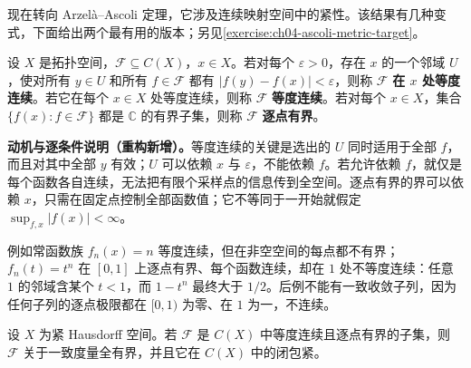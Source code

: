 \documentclass[../../main.tex]{subfiles}%
\begin{document}
现在转向 Arzel\`a--Ascoli 定理，它涉及连续映射空间中的紧性。该结果有几种变式，下面给出两个最有用的版本；另见\cref{exercise:ch04-ascoli-metric-target}。
\begin{definition}[等度连续与逐点有界]\label{definition:ch04-equicontinuous-pointwise-bounded}
设 $X$ 是拓扑空间，$\mathcal F\subseteq C(X)$，$x\in X$。若对每个 $\varepsilon>0$，存在 $x$ 的一个邻域 $U$，使对所有 $y\in U$ 和所有 $f\in\mathcal F$ 都有 $|f(y)-f(x)|<\varepsilon$，则称 $\mathcal F$ \textbf{在 $x$ 处等度连续}。若它在每个 $x\in X$ 处等度连续，则称 $\mathcal F$ \textbf{等度连续}。若对每个 $x\in X$，集合 $\{f(x):f\in\mathcal F\}$ 都是 $\mathbb C$ 的有界子集，则称 $\mathcal F$ \textbf{逐点有界}。
\end{definition}
\begin{remark}
\textbf{动机与逐条件说明（重构新增）。}等度连续的关键是选出的 $U$ 同时适用于全部 $f$，而且对其中全部 $y$ 有效；$U$ 可以依赖 $x$ 与 $\varepsilon$，不能依赖 $f$。若允许依赖 $f$，就仅是每个函数各自连续，无法把有限个采样点的信息传到全空间。逐点有界的界可以依赖 $x$，只需在固定点控制全部函数值；它不等同于一开始就假定 $\sup_{f,x}|f(x)|<\infty$。

例如常函数族 $f_n(x)=n$ 等度连续，但在非空空间的每点都不有界；$f_n(t)=t^n$ 在 $[0,1]$ 上逐点有界、每个函数连续，却在 $1$ 处不等度连续：任意 $1$ 的邻域含某个 $t<1$，而 $1-t^n$ 最终大于 $1/2$。后例不能有一致收敛子列，因为任何子列的逐点极限都在 $[0,1)$ 为零、在 $1$ 为一，不连续。
\end{remark}
\begin{theorem}\label{theorem:ch04-ascoli-one}
设 $X$ 为紧 Hausdorff 空间。若 $\mathcal F$ 是 $C(X)$ 中等度连续且逐点有界的子集，则 $\mathcal F$ 关于一致度量全有界，并且它在 $C(X)$ 中的闭包紧。
\end{theorem}
\end{document}
